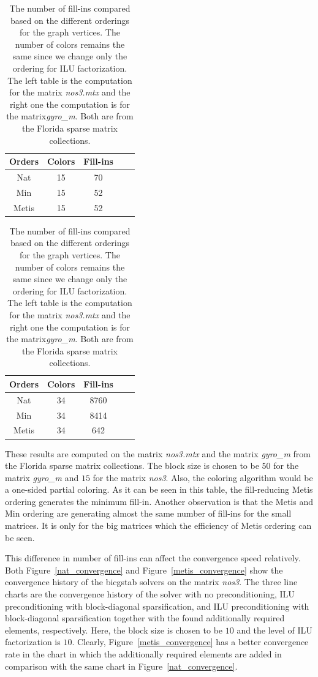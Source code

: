 \documentclass[12pt, oneside]{book}
\begin{document}
\begin{table}
\begin{tabular}{|c|c|c|c|c|}
\hline
Orders & Colors & Fill-ins\\\hline
Nat & 15 & 70\\\hline
Min & 15 & 52\\\hline
Metis & 15 & 52\\\hline
\end{tabular}
\hfill
\begin{tabular}{|c|c|c|c|c|}
\hline
Orders & Colors & Fill-ins \\\hline
Nat & 34 & 8760 \\\hline
Min & 34 & 8414 \\\hline
Metis & 34 & 642\\\hline
\end{tabular}
\caption{The number of fill-ins compared based on the different orderings
for the graph vertices. The number of colors remains the same since we change only the ordering for
ILU factorization.
The left table is the computation for the matrix \textit{nos3.mtx} 
and the right one the computation is for the matrix\textit{gyro\_m}.
Both are from the Florida sparse matrix collections.}
\label{ilu-effect}
\end{table}

These results are computed on the matrix \textit{nos3.mtx}
and the matrix \textit{gyro\_m} from 
the Florida sparse matrix collections. The block size is
chosen to be $50$ for the matrix \textit{gyro\_m} and $15$ for 
the matrix \textit{nos3}. Also, the coloring algorithm would be a one-sided
partial coloring. As it can be seen in this table, the fill-reducing Metis ordering 
generates the minimum fill-in.
Another observation is that the Metis and Min ordering are generating almost the same
number of fill-ins for the small matrices. 
It is only for the big matrices which the efficiency of Metis ordering can be seen.

This difference in number of fill-ins can affect the convergence speed
relatively. Both Figure~\ref{nat_convergence}
and Figure~\ref{metis_convergence} show
the convergence history of the bicgstab solvers on the matrix \textit{nos3}.
The three line charts are the convergence history of the solver with
no preconditioning, ILU preconditioning with block-diagonal sparsification,
and ILU preconditioning with block-diagonal sparsification together with the found
additionally required elements, respectively.
Here, the block size is chosen to be $10$ and the level of ILU factorization
is $10$.
Clearly, Figure~\ref{metis_convergence} has a better convergence rate in the chart
in which the additionally required elements are added in comparison with the same 
chart in Figure~\ref{nat_convergence}.
\end{document}
